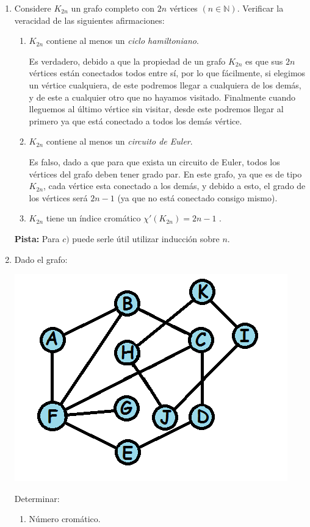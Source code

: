 \documentclass[spanish, fleqn]{article}
\title{Estructuras Discretas \\
       Tarea \#\num \\
       $``$\textit{Don Grafo ataca!}$"$}
\author{Andrés Navarro \\ 201673001-K}
\date{}
\begin{document}
\maketitle
\thispagestyle{empty}

\begin{enumerate}

\item Considere \(K_{2n} \) un grafo completo con \(2n\) vértices \((n\in \mathbb{N} )\). Verificar la veracidad de las siguientes afirmaciones:
\begin{enumerate}
\item \(K_{2n}\) contiene al menos un \textit{ciclo hamiltoniano}.

Es verdadero, debido a que la propiedad de un grafo $K_{2n}$ es que sus $2n$ vértices están conectados todos entre sí, por lo que fácilmente, si elegimos un vértice cualquiera, de este podremos llegar a cualquiera de los demás, y de este a cualquier otro que no hayamos visitado. Finalmente cuando lleguemos al último vértice sin visitar, desde este podremos llegar al primero ya que está conectado a todos los demás vértice.
 
\item \(K_{2n}\) contiene al menos un \textit{circuito de Euler}.

Es falso, dado a que para que exista un circuito de Euler, todos los vértices del grafo deben tener grado par. En este grafo, ya que es de tipo $K_{2n}$, cada vértice esta conectado a los demás, y debido a esto, el grado de los vértices será $2n-1$ (ya que no está conectado consigo mismo).

\item \(K_{2n}\) tiene un índice cromático \( \chi'(K_{2n}) = 2n - 1 \) .


\end{enumerate}

\textbf{Pista:} Para \( c) \) puede serle útil utilizar inducción sobre \(n\).

\item Dado el grafo:
\begin{center}
\includegraphics[scale=0.5]{Grafo2}
\end{center}
Determinar: 
\begin{enumerate}
\item{Número cromático.}


\end{enumerate}
\end{enumerate}
\end{document}

